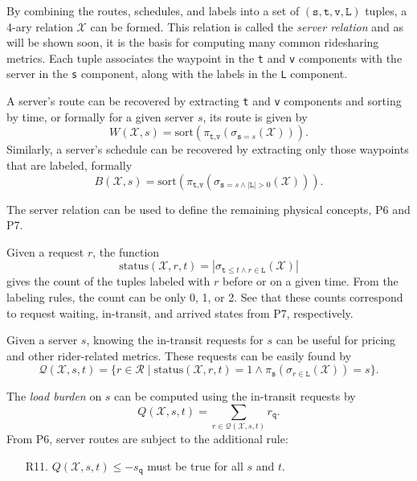 By combining the routes, schedules, and labels into
a set of $(\texttt{s},\texttt{t},\texttt{v},\texttt{L})$ tuples, a
4-ary relation $\mathcal{X}$ can be formed. This relation is called the
\emph{server relation} and as will be shown soon, it is the basis for computing many common ridesharing metrics.
Each tuple associates the waypoint in the \texttt{t} and \texttt{v} components with the server
in the \texttt{s} component, along with the labels in the \texttt{L} component.

A server's route can be recovered by extracting \texttt{t} and \texttt{v}
components and sorting by time, or formally for a given server $s$, its route
is given by
$$W(\mathcal{X},s)=\textrm{sort}(\pi_{\texttt{t},\texttt{v}}(\sigma_{\texttt{s}=s}(\mathcal{X}))).$$
Similarly, a server's schedule can be recovered by
extracting only those waypoints that are labeled, formally
$$B(\mathcal{X},s)=\textrm{sort}(\pi_{\texttt{t},\texttt{v}}(\sigma_{\texttt{s}=s\land |\texttt{L}|>0}(\mathcal{X}))).$$

The server relation can be used to define the remaining physical concepts, P6 and P7.

Given a request $r$, the function
\begin{equation}
\label{eq:status}
\textrm{status}(\mathcal{X},r,t)=|\sigma_{\texttt{t}\leq t\land
r\in\texttt{L}}(\mathcal{X})|
\end{equation}
gives the count of the tuples labeled with $r$
before or on a given time. From the labeling rules, the count can be only 0, 1,
or 2. See that these counts correspond to request waiting, in-transit, and arrived states
from P7, respectively.

Given a server $s$, knowing the in-transit requests for $s$ can be useful for
pricing and other rider-related
metrics. %
These requests can be easily found by
$$\mathcal{Q}(\mathcal{X},s,t)=\{r\in\mathcal{R}\mid\textrm{status}(\mathcal{X},r,t)=1
\land\pi_\texttt{s}(\sigma_{r\in\texttt{L}}(\mathcal{X}))=s\}.$$

The \emph{load burden} on $s$ can be computed using the in-transit requests by
\begin{equation}
\label{eq:load}
Q(\mathcal{X},s,t)=\sum_{r\in\mathcal{Q}(\mathcal{X},s,t)}r_\texttt{q}.
\end{equation}
From P6, server routes are subject to the additional rule:
\begin{enumerate}
\item[R11.] $Q(\mathcal{X},s,t)\leq -s_\texttt{q}$ must be true for all $s$ and $t$.
\end{enumerate}

